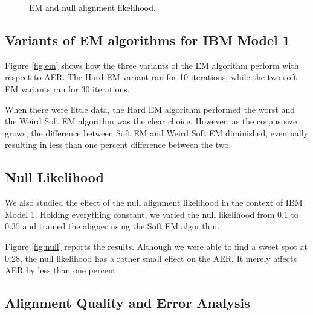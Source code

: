 \documentclass[12pt]{article}   %
\begin{document}
\begin{figure}[h*]
\centering
{}
\label{fig:params}
\caption{EM and null alignment likelihood.}
\end{figure}


\subsection{Variants of EM algorithms for IBM Model 1}
Figure \ref{fig:em} shows how the three variants of the EM algorithm perform with respect to AER. The Hard EM variant ran for 10 iterations, while the two soft EM variants ran for 30 iterations.

When there were little data, the Hard EM algorithm performed the worst and the Weird Soft EM algorithm was the clear choice. However, as the corpus size grows, the difference between Soft EM and Weird Soft EM diminished, eventually resulting in less than one percent difference between the two.


\subsection{Null Likelihood}
We also studied the effect of the null alignment likelihood in the context of IBM Model 1. Holding everything constant, we varied the null likelihood from $0.1$ to $0.35$ and trained the aligner using the Soft EM algorithm. 

Figure \ref{fig:null} reports the results. Although we were able to find a sweet spot at 0.28, the null likelihood has a rather small effect on the AER. It merely affects AER by less than one percent.


\subsection{Alignment Quality and Error Analysis}
\end{document}
